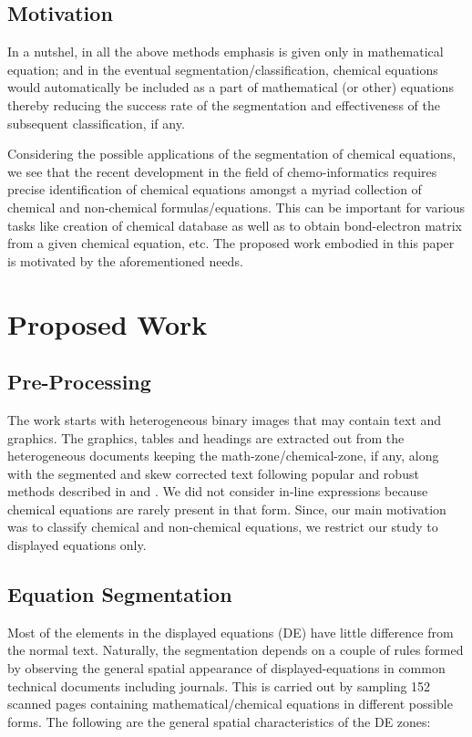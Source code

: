 \documentclass[oneside,a4paper,12pt]{book}
\begin{document}
\section{Motivation}  
 In a nutshel, in all the above methods emphasis is given only in mathematical equation; and in the eventual segmentation/classification, chemical equations would automatically be included as a part of mathematical (or other) equations thereby reducing the success rate  of the segmentation and effectiveness of the
subsequent classification, if any.

  Considering the possible applications of the segmentation of chemical equations, we see that the recent development in the field of chemo-informatics requires precise identification of chemical equations amongst a myriad collection of chemical and non-chemical
  formulas/equations. This can be important for various tasks like creation of chemical database as well as to obtain bond-electron matrix from a given chemical equation, etc.
  The proposed work  embodied in this paper is motivated by the aforementioned needs. 


\chapter{Proposed Work}
\label{sc:algo}

\section{Pre-Processing}

The work starts with  heterogeneous binary images that  may contain text and graphics.
The graphics, tables and headings are extracted out from the heterogeneous documents keeping the  math-zone/chemical-zone, if any, along
with the  segmented and skew corrected text following popular and robust methods described in \cite{skm_06} and \cite{skm_07}.  
We did not consider in-line expressions because chemical equations are rarely present in that form. Since, our main motivation was to classify chemical and non-chemical equations, we restrict our study to displayed equations only.

\section{Equation Segmentation}

Most of the elements in the displayed equations (DE) have little difference from the  normal text.
Naturally, the segmentation depends on a couple of rules formed by observing the general spatial appearance
of displayed-equations in common technical documents including journals.
This is carried out  by sampling 152 scanned pages containing mathematical/chemical equations in different possible forms. The following  are the general spatial characteristics of the DE zones:
\end{document}
